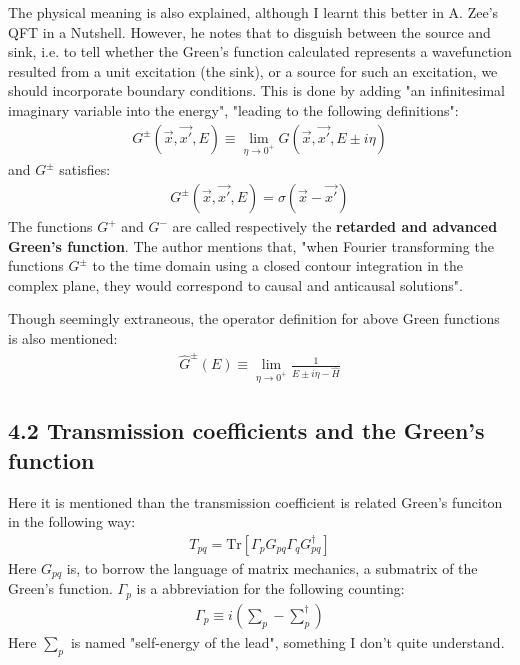 \documentclass{article}
\numberwithin{equation}{subsection} %
\theoremstyle{definition}
\begin{document}
  The physical meaning is also explained, although I learnt this
  better in A. Zee's QFT in a Nutshell. However, he notes that
  to disguish between the source and sink, i.e. to tell whether
  the Green's function calculated represents a wavefunction
  resulted from a unit excitation (the sink), or a source for such
  an excitation, we should incorporate boundary conditions. This is
  done by adding "an infinitesimal imaginary variable into the energy",
  "leading to the following definitions":
  \begin{align}
      G^{\pm}(\vec{x},\vec{x'},E)\equiv \lim_{\eta\to 0^{+}}
          G(\vec{x},\vec{x'},E\pm i\eta)
  \end{align}
  and $G^{\pm}$ satisfies:
  \begin{align}
      [E\pm i\eta - H(\vec{x})] G^{\pm}(\vec{x},\vec{x'},E)=
          \sigma(\vec{x}-\vec{x'})
  \end{align}
  The functions $G^+$ and $G^-$ are called respectively the
  \textbf{retarded and advanced Green's function}. The author
  mentions that, "when Fourier transforming the functions $G^\pm$ to
  the time domain using a closed contour integration in the complex 
  plane, they would correspond to causal and anticausal solutions".

  Though seemingly extraneous, the operator definition for above
  Green functions is also mentioned:
  \begin{align}
      \hat{G}^{\pm}(E)\equiv \lim_{\eta\to 0^+}
          \frac{1}{E\pm i\eta-\hat{H}}
  \end{align}
  \subsection{4.2 Transmission coefficients and the Green’s function}
  \label{sec:4.2_Transmission_coefficients_and_the_Greens_function}
  
  Here it is mentioned than the transmission coefficient is related
  Green's funciton in the following way:
  \begin{align}
      T_{pq} = \text{Tr}\left[\Gamma_p G_{pq}\Gamma_q G^{\dagger}_{pq}
              \right]
  \end{align}
  Here $G_{pq}$ is, to borrow the language of matrix mechanics,
  a submatrix of the Green's function. $\Gamma_p$ is a abbreviation
  for the following counting:
  \begin{align}
      \label{eq:}
      \Gamma_p \equiv i(\textstyle\sum_p-\textstyle\sum^\dagger_p)
  \end{align}
  Here $\sum_p$ is named "self-energy of the lead", something I
  don't quite understand.
\end{document}
